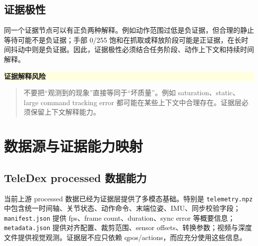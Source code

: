 \documentclass[UTF8,zihao=-4,oneside,openany]{ctexrep}
\newcommand{\Code}[1]{\texttt{#1}}
\newenvironment{warningbox}[1]{\vspace{0.5em}\noindent\colorbox{LightYellow}{\parbox{0.96\linewidth}{\textbf{#1}}}\par\vspace{-0.2em}\begin{quote}\small}{\end{quote}\vspace{0.3em}}
\begin{document}
\subsection{证据极性}

同一个证据节点可以有正负两种解释。例如动作范围过低是负证据，但合理的静止等待可能不是负证据；手部 0/255 饱和在抓取或释放阶段可能是正证据，在长时间抖动中则是负证据。因此，证据极性必须结合任务阶段、动作上下文和持续时间解释。

\begin{warningbox}{证据解释风险}
不要把“观测到的现象”直接等同于“坏质量”。例如 saturation、static、large command tracking error 都可能在某些上下文中合理存在。证据层必须保留上下文解释能力。
\end{warningbox}

\section{数据源与证据能力映射}

\subsection{TeleDex processed 数据能力}

当前上游 processed 数据已经为证据层提供了多模态基础。特别是 \Code{telemetry.npz} 中包含统一时间轴、关节状态、动作命令、末端位姿、IMU、同步校验字段；\Code{manifest.json} 提供 fps、frame count、duration、sync error 等概要信息；\Code{metadata.json} 提供对齐配置、裁剪范围、sensor offsets、转换参数；视频与深度文件提供视觉观测。证据层不应只依赖 qpos/actions，而应充分使用这些信息。
\end{document}

